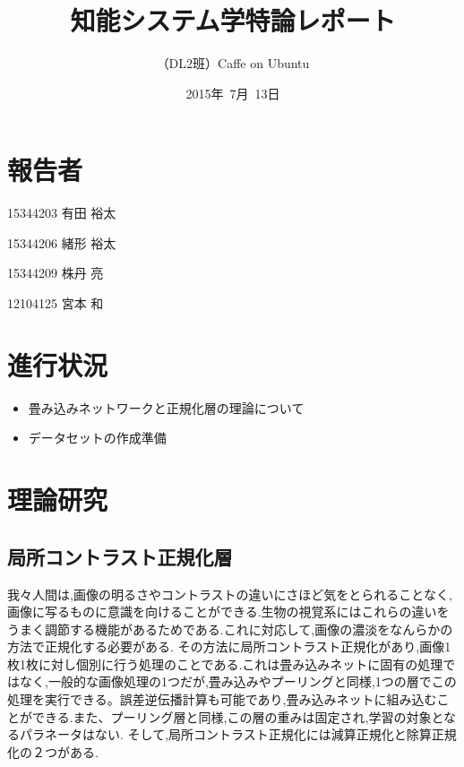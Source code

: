 \documentclass[a4paper,10pt]{jsarticle}
\title{知能システム学特論レポート}
\author{
（DL2班）Caffe on Ubuntu\\
}
\date{2015年\ 7月\ 13日}
\begin{document}
\maketitle
\section{報告者}
\begin{list}{}{}
 \item 15344203\hspace{0.5cm} 有田 裕太
 \item 15344206\hspace{0.5cm} 緒形 裕太
 \item 15344209\hspace{0.5cm} 株丹 亮
 \item 12104125\hspace{0.5cm} 宮本 和
\end{list}

\section{進行状況}

\begin{itemize}
\item 畳み込みネットワークと正規化層の理論について
\item データセットの作成準備
\end{itemize}

\section{理論研究}

\subsection{局所コントラスト正規化層}

我々人間は,画像の明るさやコントラストの違いにさほど気をとられることなく,画像に写るものに意識を向けることができる.生物の視覚系にはこれらの違いをうまく調節する機能があるためである.これに対応して,画像の濃淡をなんらかの方法で正規化する必要がある.
その方法に局所コントラスト正規化があり,画像1枚1枚に対し個別に行う処理のことである.これは畳み込みネットに固有の処理ではなく,一般的な画像処理の1つだが,畳み込みやプーリングと同様,1つの層でこの処理を実行できる。誤差逆伝播計算も可能であり,畳み込みネットに組み込むことができる.また、プーリング層と同様,この層の重みは固定され,学習の対象となるパラネータはない.
そして,局所コントラスト正規化には減算正規化と除算正規化の２つがある.
\end{document}

